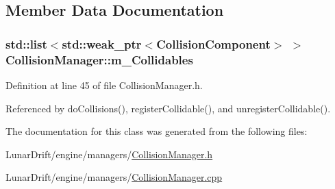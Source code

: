 \subsection{Member Data Documentation}
\subsubsection[{\texorpdfstring{m\+\_\+\+Collidables}{m_Collidables}}]{\setlength{\rightskip}{0pt plus 5cm}std\+::list$<$std\+::weak\+\_\+ptr$<${\bf Collision\+Component}$>$ $>$ Collision\+Manager\+::m\+\_\+\+Collidables\hspace{0.3cm}{\ttfamily [private]}}\hypertarget{class_collision_manager_a1e8ca739d58f92f5bae1d4dea802adcc}{}\label{class_collision_manager_a1e8ca739d58f92f5bae1d4dea802adcc}


Definition at line 45 of file Collision\+Manager.\+h.



Referenced by do\+Collisions(), register\+Collidable(), and unregister\+Collidable().



The documentation for this class was generated from the following files\+:\begin{DoxyCompactItemize}
\item 
Lunar\+Drift/engine/managers/\hyperlink{_collision_manager_8h}{Collision\+Manager.\+h}\item 
Lunar\+Drift/engine/managers/\hyperlink{_collision_manager_8cpp}{Collision\+Manager.\+cpp}\end{DoxyCompactItemize}
